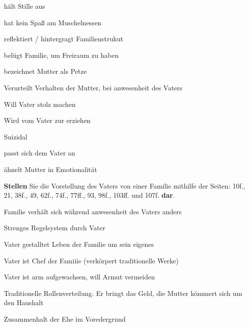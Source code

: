 \stopframedtask

\startitemize[packed]
\item
  hält Stille aus
\item
  hat kein Spaß am Muschelnessen
\item
  reflektiert / hintergragt Familienstrukut
\item
  belügt Familie, um Freiraum zu haben
\item
  bezeichnet Mutter als Petze
\item
  Verurteilt Verhalten der Mutter, bei anwesenheit des Vaters
\stopitemize

\stopsectionlevel

\startsectionlevel[title={Sohn, der
\quotation{Sensible}},reference={sohn-der-sensible}]

\startitemize[packed]
\item
  Will Vater stolz machen
\item
  Wird vom Vater zur  erziehen
\item
  Suizidal
\item
  passt sich dem Vater an
\item
  ähnelt Mutter in Emotionalität
\stopitemize

\stopsectionlevel

\stopsectionlevel

\startsectionlevel[title={Eine \quotation{richtige}
Familie},reference={eine-richtige-familie}]

\startframedtask
{\bf Stellen} Sie die Vorstellung des Vaters von einer
 Familie mithilfe der Seiten: 10f., 21, 38f., 49,
62f., 74f., 77ff., 93, 98f., 103ff. und 107f. {\bf dar}.

\stopframedtask

\startitemize[packed]
\item
  Familie verhält sich während anwesenheit des Vaters anders
\item
  Strenges Regelsystem durch Vater
\item
  Vater gestalltet Leben der Familie um sein eigenes
\item
  Vater ist Chef der Famiiie (verkörpert traditionelle Werke)
\item
  Vater ist arm aufgewachsen, will Armut vermeiden
\item
  Traditionelle Rollenverteilung. Er bringt das Geld, die Mutter kömmert
  sich um den Haushalt
\item
  Zusammenhalt der Ehe im Voredergrund
\stopitemize

\stopsectionlevel
